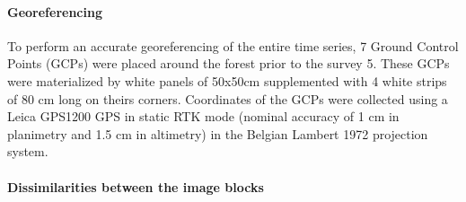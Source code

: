 \documentclass[remotesensing,article,submit,moreauthors,pdftex,12pt,a4paper]{mdpi} %
\begin{document}
\paragraph{Georeferencing}

To perform an accurate georeferencing of the entire time series, 7 Ground Control Points (GCPs) were placed around the forest prior to the survey 5. These GCPs were materialized by white panels of 50x50cm supplemented with 4 white strips of 80 cm long on theirs corners. 
Coordinates of the GCPs were collected using a Leica GPS1200 GPS in static RTK mode (nominal accuracy of 1 cm in planimetry and 1.5 cm in altimetry) in the Belgian Lambert 1972 projection system.

\paragraph{Dissimilarities between the image blocks}
\end{document}
